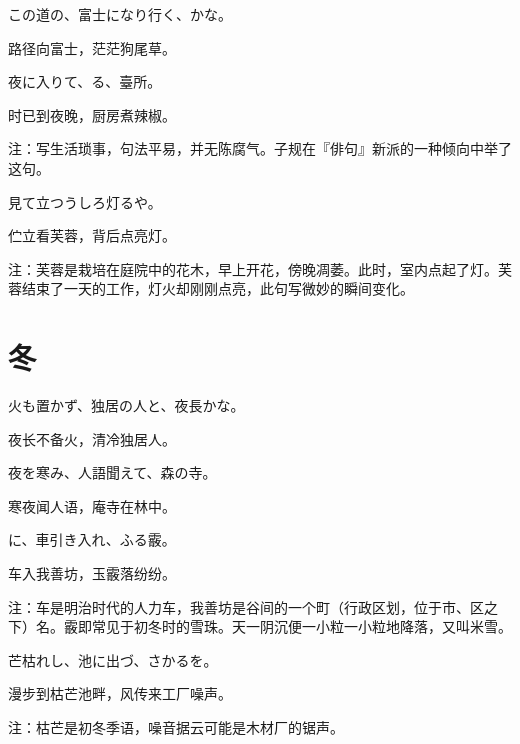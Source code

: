 \begin{haiku}
    {\FH この道の、富士になり行く、かな。}

    {\FK 路径向富士，茫茫狗尾草。}
\end{haiku}

\begin{haiku}
    {\FH 夜に入りて、る、臺所。}

    {\FK 时已到夜晚，厨房煮辣椒。}

    {\FT 注：写生活琐事，句法平易，并无陈腐气。子规在『俳句』新派的一种倾向中举了这句。}
\end{haiku}

\begin{haiku}
    {\FH {}見て立つうしろ灯るや。}

    {\FK 伫立看芙蓉，背后点亮灯。}

    {\FT 注：芙蓉是栽培在庭院中的花木，早上开花，傍晚凋萎。此时，室内点起了灯。芙蓉结束了一天的工作，灯火却刚刚点亮，此句写微妙的瞬间变化。}
\end{haiku}

\section{\FK 冬}

\setcounter{haikucounter}{0}

\begin{haiku}
    {\FH 火も置かず、独居の人と、夜長かな。}

    {\FK 夜长不备火，清冷独居人。}
\end{haiku}

\begin{haiku}
    {\FH 夜を寒み、人語聞えて、森の寺。}

    {\FK 寒夜闻人语，庵寺在林中。}
\end{haiku}

\begin{haiku}
    {\FH {}に、車引き入れ、ふる霰。}

    {\FK 车入我善坊，玉霰落纷纷。}

    {\FT 注：车是明治时代的人力车，我善坊是谷间的一个町（行政区划，位于市、区之下）名。霰即常见于初冬时的雪珠。天一阴沉便一小粒一小粒地降落，又叫米雪。}
\end{haiku}

\begin{haiku}
    {\FH 芒枯れし、池に出づ、さかるを。}

    {\FK 漫步到枯芒池畔，风传来工厂噪声。}

    {\FT 注：枯芒是初冬季语，噪音据云可能是木材厂的锯声。}
\end{haiku}

